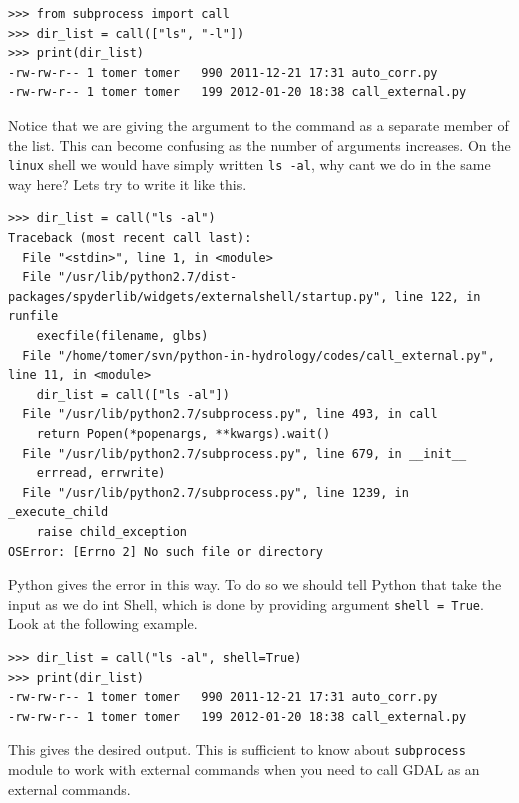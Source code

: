 \documentclass[10pt]{book}
\begin{document}
\beforeverb \begin{verbatim}
>>> from subprocess import call
>>> dir_list = call(["ls", "-l"])
>>> print(dir_list)
-rw-rw-r-- 1 tomer tomer   990 2011-12-21 17:31 auto_corr.py
-rw-rw-r-- 1 tomer tomer   199 2012-01-20 18:38 call_external.py
\end{verbatim} \afterverb
Notice that we are giving the argument to the command as a separate member of the list. This can become confusing as the number of arguments increases. On the \verb"linux" shell we would have simply written \verb"ls -al", why cant we do in the same way here? Lets try to write it like this.
\beforeverb \begin{verbatim}
>>> dir_list = call("ls -al")
Traceback (most recent call last):
  File "<stdin>", line 1, in <module>
  File "/usr/lib/python2.7/dist-packages/spyderlib/widgets/externalshell/startup.py", line 122, in runfile
    execfile(filename, glbs)
  File "/home/tomer/svn/python-in-hydrology/codes/call_external.py", line 11, in <module>
    dir_list = call(["ls -al"])
  File "/usr/lib/python2.7/subprocess.py", line 493, in call
    return Popen(*popenargs, **kwargs).wait()
  File "/usr/lib/python2.7/subprocess.py", line 679, in __init__
    errread, errwrite)
  File "/usr/lib/python2.7/subprocess.py", line 1239, in _execute_child
    raise child_exception
OSError: [Errno 2] No such file or directory
\end{verbatim} \afterverb
Python gives the error in this way. To do so we should tell Python that take the input as we do int Shell, which is done by providing argument \verb"shell = True". Look at the following example.
\beforeverb \begin{verbatim}
>>> dir_list = call("ls -al", shell=True)
>>> print(dir_list)
-rw-rw-r-- 1 tomer tomer   990 2011-12-21 17:31 auto_corr.py
-rw-rw-r-- 1 tomer tomer   199 2012-01-20 18:38 call_external.py
\end{verbatim} \afterverb
This gives the desired output. This is sufficient to know about \verb"subprocess" module to work with external commands when you need to call GDAL as an external commands. 
\end{document}

